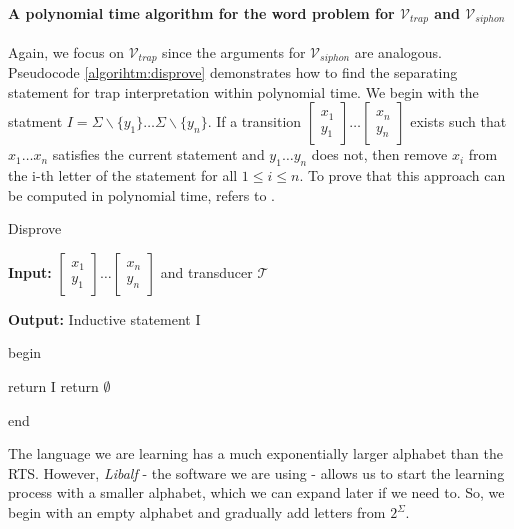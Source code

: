 \paragraph{A polynomial time algorithm for the word problem for $\mathcal{V}_{trap}$ and $\mathcal{V}_{siphon}$}
Again, we focus on $\mathcal{V}_{trap}$ since the arguments for $\mathcal{V}_{siphon}$ are analogous.
Pseudocode \ref{algorihtm:disprove} demonstrates how to find the separating 
statement for trap interpretation within polynomial time.
We begin with the statment $I = \Sigma \backslash \{y_1\} \dots \Sigma \backslash \{y_n\}$.
If a transition $\left[\substack{x_1 \\ y_1}\right] \dots \left[\substack{x_n \\ y_n}\right]$ exists such that 
$x_1 \dots x_n$ satisfies the current statement and $y_1 \dots y_n$ does not,
then remove $x_i$ from the i-th letter of the statement for all $1 \leq i \leq n$.
To prove that this approach can be computed in polynomial time, refers to \cite{latex}.

\begin{algorithm}
    \caption{Disprove}\label{algorihtm:disprove}
    \textbf{Input: } $\left[\substack{x_1 \\ y_1}\right] \dots \left[\substack{x_n \\ y_n}\right]$ and transducer $\mathcal{T}$

    \textbf{Output: } Inductive statement I
    
    begin
    \begin{algorithmic}[1]
        \EndFor
                \EndFor
            \Else
                \State return I
            \EndIf
        \EndWhile
        \State return $\emptyset$
    \end{algorithmic}
    end
\end{algorithm}
The language we are learning has a much exponentially larger alphabet than the RTS. 
However, \textit{Libalf} - the software we are using - allows us to start the learning process with a smaller alphabet, 
which we can expand later if we need to. 
So, we begin with an empty alphabet and gradually add letters from $2^\Sigma$.
